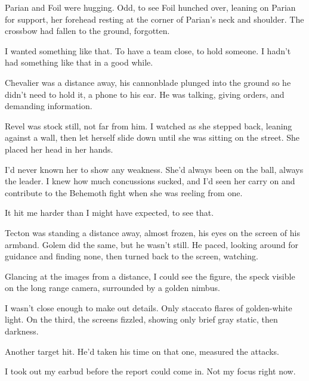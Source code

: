 Parian and Foil were hugging.  Odd, to see Foil hunched over, leaning on Parian for support, her forehead resting at the corner of Parian's neck and shoulder.  The crossbow had fallen to the ground, forgotten.



I wanted something like that.  To have a team close, to hold someone.  I hadn't had something like that in a good while.



Chevalier was a distance away, his cannonblade plunged into the ground so he didn't need to hold it, a phone to his ear.  He was talking, giving orders, and demanding information.



Revel was stock still, not far from him.  I watched as she stepped back, leaning against a wall, then let herself slide down until she was sitting on the street.  She placed her head in her hands.



I'd never known her to show any weakness.  She'd always been on the ball, always the leader.  I knew how much concussions sucked, and I'd seen her carry on and contribute to the Behemoth fight when she was reeling from one.



It hit me harder than I might have expected, to see that.



Tecton was standing a distance away, almost frozen, his eyes on the screen of his armband.  Golem did the same, but he wasn't still.  He paced, looking around for guidance and finding none, then turned back to the screen, watching.



Glancing at the images from a distance, I could see the figure, the speck visible on the long range camera, surrounded by a golden nimbus.



I wasn't close enough to make out details.  Only staccato flares of golden-white light.  On the third, the screens fizzled, showing only brief gray static, then darkness.



Another target hit.  He'd taken his time on that one, measured the attacks.



I took out my earbud before the report could come in.  Not my focus right now.



